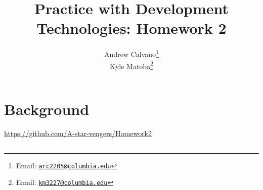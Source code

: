 \documentclass[10pt]{article}
\theoremstyle{remark}
\numberwithin{equation}{section}
\begin{document}
\title{Practice with Development Technologies: Homework 2 }

\author{
Andrew Calvano\thanks{Email: \href{mailto:arc2205@columbia.edu}{\texttt{arc2205@columbia.edu}}} \\ 
Kyle Matoba\thanks{Email: \href{mailto:km3227@columbia.edu}{\texttt{km3227@columbia.edu}}}
}
\date{}
\maketitle




\section{Background} 

\url{https://github.com/A-star-vengers/Homework2} 
\subsection{}


\begin{spacing}{0.9}
\printbibliography
\end{spacing}
\end{document}
